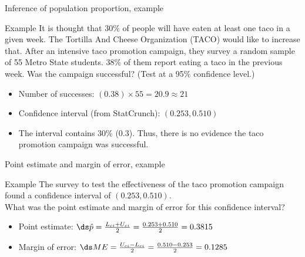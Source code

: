 \documentclass[xcolor=table, handout]{beamer}
\begin{document}
\begin{frame}{Inference of population proportion, example}
\begin{exampleblock}{Example}
\large
It is thought that 30\% of people will have eaten at least one taco in a given week. The Tortilla And Cheese Organization (TACO) would like to increase that. After an intensive taco promotion campaign, they survey a random sample of 55 Metro State students. 38\% of them report eating a taco in the previous week. Was the campaign successful? (Test at a 95\% confidence level.)

\begin{itemize}
\pause\item Number of successes: $(0.38) \times 55 = 20.9 \approx 21$
\pause\item Confidence interval (from StatCrunch): $(0.253, 0.510)$
\pause\item The interval contains 30\% (0.3). Thus, there is no evidence the taco promotion campaign was successful.
\end{itemize}
\end{exampleblock}
\end{frame}

\begin{frame}{Point estimate and margin of error, example}
\begin{exampleblock}{Example}
\large
The survey to test the effectiveness of the taco promotion campaign found a confidence interval of  $(0.253, 0.510)$.\\
\medskip
What was the point estimate and margin of error for this confidence interval?
\begin{itemize}
\pause\item Point estimate: $\ds \hat p = \frac{L_{ci} + U_{ci}}{2} = \frac {0.253 + 0.510}{2 } = 0.3815$
\pause\item Margin of error: $\ds ME = \frac{U_{ci} - L_{ci}}{2} = \frac {0.510 - 0.253}{2} = 0.1285$ 
\end{itemize}
\end{exampleblock}
\end{frame}
\end{document}
